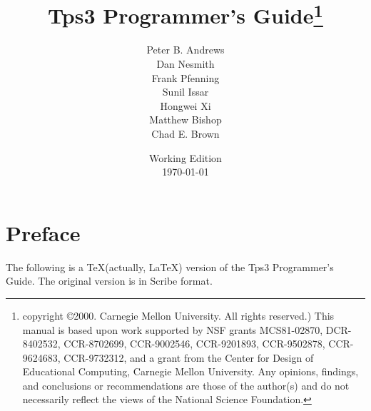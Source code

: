 \documentclass[11pt]{amsbook}
\numberwithin{figure}{chapter} %
\def\TPS{{\sc Tps3 }}
\begin{document}


\frontmatter
\title{\TPS Programmer's Guide\thanks{
copyright \copyright 2000. Carnegie Mellon University.  All rights reserved.)
This manual is based upon work supported by
NSF grants MCS81-02870, DCR-8402532, CCR-8702699, 
CCR-9002546, CCR-9201893, CCR-9502878, CCR-9624683, CCR-9732312,
and a grant from the Center for Design of Educational Computing,
Carnegie Mellon University. Any opinions, findings, and conclusions or
recommendations are those of the author(s) and do not necessarily reflect
the views of the National Science Foundation.}
}
\author{Peter B. Andrews \\
Dan Nesmith \\
Frank Pfenning \\
Sunil Issar \\
Hongwei Xi \\
Matthew Bishop \\
Chad E. Brown}
\date{Working Edition \\
\today}

\maketitle

\setcounter{tocdepth}{5}
\tableofcontents
\newpage

%
\chapter*{Preface}
\pagestyle{plain}
The following is a \TeX (actually, \LaTeX) version of the \TPS Programmer's Guide.
The original version is in Scribe format.
\mainmatter\pagestyle{headings}
% 
%
%
%
%
%
%
%
%
%
%
%
%
%
%
%
%
%

%
%
%
%
%

\backmatter

\printindex
\end{document}
